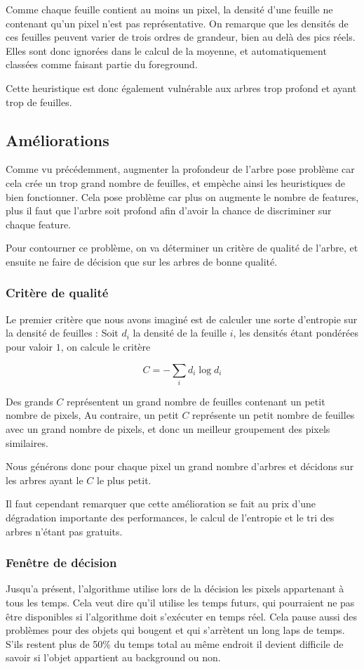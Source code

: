\documentclass[8pt,a4paper]{article}
\begin{document}
\begin{multicols}{2}
			Comme chaque feuille contient au moins un pixel, la densité d'une feuille ne contenant qu'un pixel n'est pas
			représentative. On remarque que les densités de ces feuilles peuvent varier de trois ordres de grandeur, bien
			au delà des pics réels. Elles sont donc ignorées dans le calcul de la moyenne, et automatiquement classées
			comme faisant partie du foreground. 

			Cette heuristique est donc également vulnérable aux arbres trop profond et ayant trop de feuilles. 

	\subsection{Améliorations}
		Comme vu précédemment, augmenter la profondeur de l'arbre pose problème car cela crée un trop grand nombre de feuilles, 
		et empèche ainsi les heuristiques de bien fonctionner. Cela pose problème car plus on augmente le nombre de features,
		plus il faut que l'arbre soit profond afin d'avoir la chance de discriminer sur chaque feature. 

		Pour contourner ce problème, on va déterminer un critère de qualité de l'arbre, et ensuite ne faire de décision que sur
		les arbres de bonne qualité. 
		\subsubsection{Critère de qualité}
			Le premier critère que nous avons imaginé est de calculer une sorte d'entropie sur la densité de feuilles : 
			Soit $d_{i}$ la densité de la feuille $i$, les densités étant pondérées pour valoir $1$, on calcule le critère 
			
			\[ C = -\sum_{i} d_{i}\log{d_{i}} \]

			Des grands $C$ représentent un grand nombre de feuilles contenant un petit nombre de pixels, Au contraire, un petit $C$
			représente un petit nombre de feuilles avec un grand nombre de pixels, et donc un meilleur groupement des pixels
			similaires. 

			Nous générons donc pour chaque pixel un grand nombre d'arbres et décidons sur les arbres ayant le $C$ le plus petit.

			Il faut cependant remarquer que cette amélioration se fait au prix d'une dégradation importante des performances,
			le calcul de l'entropie et le tri des arbres n'étant pas gratuits.
		\subsubsection{Fenêtre de décision}
			Jusqu'a présent, l'algorithme utilise lors de la décision les pixels appartenant à tous les temps. Cela veut dire qu'il
			utilise les temps futurs, qui pourraient ne pas être disponibles si l'algorithme doit s'exécuter en temps réel. Cela
			pause aussi des problèmes pour des objets qui bougent et qui s'arrètent un long laps de temps. S'ils restent plus
			de 50\% du temps total au même endroit il devient difficile de savoir si l'objet appartient au background ou non.


\end{multicols}
\end{document}
